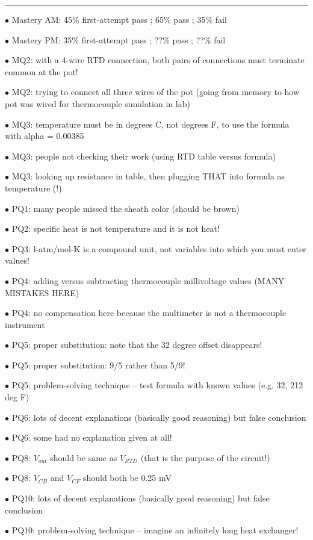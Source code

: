 \filbreak \vskip 5pt \hrule \vskip 5pt  \vskip 10pt

\medskip
\item{$\bullet$} Mastery AM: 45\% first-attempt pass ; 65\% pass ; 35\% fail
\item{$\bullet$} Mastery PM: 35\% first-attempt pass ; ??\% pass ; ??\% fail
\medskip
\item{$\bullet$} MQ2: with a 4-wire RTD connection, both pairs of connections must terminate common at the pot! 
\item{$\bullet$} MQ2: trying to connect all three wires of the pot (going from memory to how pot was wired for thermocouple simulation in lab)
\item{$\bullet$} MQ3: temperature must be in degrees C, not degrees F, to use the formula with alpha = 0.00385
\item{$\bullet$} MQ3: people not checking their work (using RTD table versus formula)
\item{$\bullet$} MQ3: looking up resistance in table, then plugging THAT into formula as temperature (!)
\medskip
\item{$\bullet$} PQ1: many people missed the sheath color (should be brown)
\item{$\bullet$} PQ2: specific heat is not temperature and it is not heat! 
\item{$\bullet$} PQ3: l-atm/mol-K is a compound unit, not variables into which you must enter values!
\item{$\bullet$} PQ4: adding versus subtracting thermocouple millivoltage values (MANY MISTAKES HERE)
\item{$\bullet$} PQ4: no compensation here because the multimeter is not a thermocouple instrument
\item{$\bullet$} PQ5: proper substitution: note that the 32 degree offset disappears!
\item{$\bullet$} PQ5: proper substitution: 9/5 rather than 5/9!
\item{$\bullet$} PQ5: problem-solving technique -- test formula with known values (e.g. 32, 212 deg F)
\item{$\bullet$} PQ6: lots of decent explanations (basically good reasoning) but false conclusion
\item{$\bullet$} PQ6: some had no explanation given at all!
\item{$\bullet$} PQ8: $V_{out}$ should be same as $V_{RTD}$ (that is the purpose of the circuit!)
\item{$\bullet$} PQ8: $V_{CB}$ and $V_{CF}$ should both be 0.25 mV
\item{$\bullet$} PQ10: lots of decent explanations (basically good reasoning) but false conclusion
\item{$\bullet$} PQ10: problem-solving technique -- imagine an infinitely long heat exchanger!
\medskip




\bye



